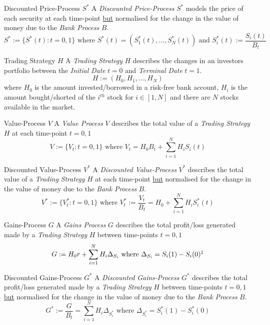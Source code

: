 \documentclass[11pt,a4paper]{article}
\begin{document}
  \begin{definition}{Discounted Price-Process $S^*$}
    A \textit{Discounted Price-Process} $S^*$ models the price of each security at each time-point \underline{but} normalised for the change in the value of money due to the \textit{Bank Process} $B$.
    \[ S^*:=\{S^*(t):t=0,1\}\text{ where }S^*(t)=(S_1^*(t),\dots,S_N^*(t))\text{ and }S_i^*(t):=\frac{S_i(t)}{B_t} \]
  \end{definition}

  \begin{definition}{Trading Strategy $H$}
    A \textit{Trading Strategy} $H$ describes the changes in an investors portfolio between the \textit{Initial Date} $t=0$ and \textit{Terminal Date} $t=1$.
    \[ H:=(H_0,H_1,\dots,H_N) \]
    where $H_0$ is the amount invested/borrowed in a risk-free bank account, $H_i$ is the amount bought/shorted of the $i^{th}$ stock for $i\in[1,N]$ and there are $N$ stocks available in the market.
  \end{definition}

  \begin{definition}{Value-Process $V$}
    A \textit{Value Process} $V$ describes the total value of a \textit{Trading Strategy} $H$ at each time-point $t=0,1$
    \[ V:=\{V_t:t=0,1\}\text{ where }V_t=H_0B_t+\sum_{i=1}^NH_iS_i(t) \]
  \end{definition}

  \begin{definition}{Discounted Value-Process $V^*$}
    A \textit{Discounted Value-Process} $V^*$ describes the total value of a \textit{Trading Strategy} $H$ at each time-point \underline{but} normalised for the change in the value of money due to the \textit{Bank Process} $B$.
    \[ V^*:=\{V_t^*:t=0,1\}\text{ where }V_t^*:=\frac{V_t}{B_t}=H_0+\sum_{i=1}^NH_iS_i^*(t) \]
  \end{definition}

  \begin{definition}{Gains-Process $G$}
    A \textit{Gains Process} $G$ describes the total profit/loss generated made by a \textit{Trading Strategy} $H$ between time-points $t=0,1$
    \[ G:=H_0r+\sum_{i=1}^NH_i\Delta_{S_i}\text{ where }\Delta_{S_i}=S_i(1)-S_i(0)\footnotemark \]
  \end{definition}

  \begin{definition}{Discounted Gains-Process $G^*$}
    A \textit{Discounted Gains-Process} $G^*$ describes the total profit/loss generated made by a \textit{Trading Strategy} $H$ between time-points $t=0,1$ \underline{but} normalised for the change in the value of money due to the \textit{Bank Process} $B$.
    \[ G^*:=\frac{G}{B_t}=\sum_{i=1}^NH_i\Delta_{S_i^*}\text{ where }\Delta_{S_i^*}=S_i^*(1)-S_i^*(0) \]
  \end{definition}
\end{document}
